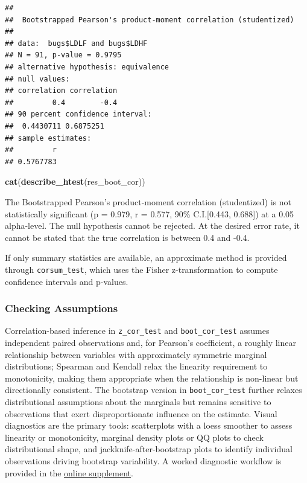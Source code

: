 \documentclass[]{interact}
\theoremstyle{plain}%
\theoremstyle{definition}
\theoremstyle{remark}
\newenvironment{Shaded}{\begin{snugshade}}{\end{snugshade}}
\newcommand{\FunctionTok}[1]{\textcolor[rgb]{0.13,0.29,0.53}{\textbf{#1}}}
\newcommand{\NormalTok}[1]{#1}
\begin{document}
\begin{verbatim}
## 
##  Bootstrapped Pearson's product-moment correlation (studentized)
## 
## data:  bugs$LDLF and bugs$LDHF
## N = 91, p-value = 0.9795
## alternative hypothesis: equivalence
## null values:
## correlation correlation 
##         0.4        -0.4 
## 90 percent confidence interval:
##  0.4430711 0.6875251
## sample estimates:
##         r 
## 0.5767783
\end{verbatim}

\begin{Shaded}
\begin{Highlighting}[]
\FunctionTok{cat}\NormalTok{(}\FunctionTok{describe\_htest}\NormalTok{(res\_boot\_cor))}
\end{Highlighting}
\end{Shaded}

The Bootstrapped Pearson's product-moment correlation (studentized) is
not statistically significant (p = 0.979, r = 0.577, 90\% C.I.{[}0.443,
0.688{]}) at a 0.05 alpha-level. The null hypothesis cannot be rejected.
At the desired error rate, it cannot be stated that the true correlation
is between 0.4 and -0.4.

If only summary statistics are available, an approximate method is
provided through \texttt{corsum\_test}, which uses the Fisher
z-transformation to compute confidence intervals and p-values.

\subsubsection{Checking Assumptions}\label{checking-assumptions-2}

Correlation-based inference in \texttt{z\_cor\_test} and
\texttt{boot\_cor\_test} assumes independent paired observations and,
for Pearson's coefficient, a roughly linear relationship between
variables with approximately symmetric marginal distributions; Spearman
and Kendall relax the linearity requirement to monotonicity, making them
appropriate when the relationship is non-linear but directionally
consistent. The bootstrap version in \texttt{boot\_cor\_test} further
relaxes distributional assumptions about the marginals but remains
sensitive to observations that exert disproportionate influence on the
estimate. Visual diagnostics are the primary tools: scatterplots with a
loess smoother to assess linearity or monotonicity, marginal density
plots or QQ plots to check distributional shape, and
jackknife-after-bootstrap plots to identify individual observations
driving bootstrap variability. A worked diagnostic workflow is provided
in the \href{https://doi.org/10.5281/zenodo.22776188}{online
supplement}.
\end{document}
